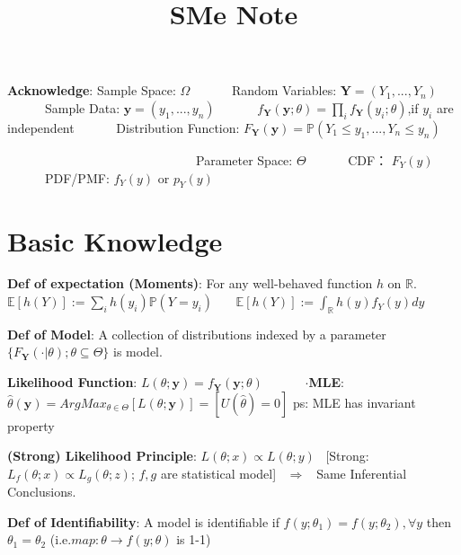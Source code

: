\documentclass[9pt]{article}
\title{SMe Note}
\author{}
\date{}
\begin{document}
\maketitle
\thispagestyle{fancy}
\vspace{-3.5cm}

\fontsize{10pt}{11pt}\selectfont
\setlength{\parindent}{8pt}


\vspace{0.3cm}
{\tiny

    \textbf{Acknowledge}: Sample Space: $\Omega$ \ \ \ \ \ \ Random Variables: $\mathbf{Y}=(Y_1,...,Y_n)$ \ \ \ \ \ \ Sample Data: $\mathbf{y}=(y_1,...,y_n)$ \ \ \ \ \ \ $f_{\mathbf{Y}}(\mathbf{y};\theta)=\prod_if_{\mathbf{Y}}(y_i;\theta)$,if $y_i$ are independent \ \ \ \ \ \ Distribution Function: $F_{\mathbf{Y}}(\mathbf{y})=\mathbb{P}(Y_1\leq y_1,...,Y_n\leq y_n)$

    \ \ \ \ \ \ \ \ \ \ \ \ \ \ \ \ \ \ \ \ \ \ \ \ \ \ \ \ \ \ Parameter Space: $\Theta$ \ \ \ \ \ \ CDF： $F_Y(y)$ \ \ \ \ \ \ PDF/PMF: $f_Y(y)$ or $p_Y(y)$

}
\vspace{-0.3cm}

\section{Basic Knowledge} %

\textbf{Def of expectation (Moments)}: For any well-behaved function $h$ on $\mathbb{R}$. $\mathbb{E}[h(Y)]:=\sum_ih(y_i)\mathbb{P}(Y=y_i)$ \ \ \ $\mathbb{E}[h(Y)]:=\int_{\mathbb{R}}h(y)f_Y(y)dy$

\textbf{Def of Model}: A collection of distributions indexed by a parameter $\{F_\mathbf{Y}(\cdot|\theta);\theta\subseteq\Theta\}$ is model.

\textbf{Likelihood Function}: $L(\theta;\mathbf{y})=f_{\mathbf{Y}}(\mathbf{y};\theta)$ \ \ \ \ \ \ $\cdot$\textbf{MLE}: $\hat{\theta}(\mathbf{y})=ArgMax_{\theta\in\Theta}[L(\theta;\mathbf{y})]=[U(\widehat{\theta})=0]$ {\scriptsize ps: MLE has invariant property}

\textbf{(Strong) Likelihood Principle}: $L(\theta;x)\propto L(\theta;y)$ \ [Strong: $L_f(\theta;x)\propto L_g(\theta;z)${\tiny ; $f,g$ are statistical model}] \ $\Rightarrow$ \ Same Inferential Conclusions.

\textbf{Def of Identifiability}: A model is identifiable if $f(y;\theta_1)=f(y;\theta_2),\forall y$ then $\theta_1=\theta_2$ {\scriptsize (i.e.$map:\theta\to f(y;\theta)$ is 1-1)}
\end{document}
